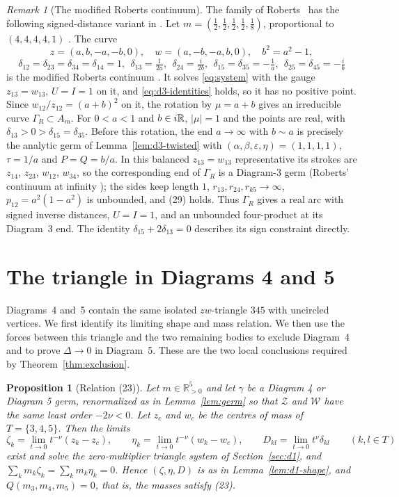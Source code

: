 \documentclass[Threeside,11pt]{article}
\newtheorem{proposition}[theorem]{Proposition}
\theoremstyle{definition}
\theoremstyle{remark}
\newtheorem{remark}[theorem]{Remark}
\numberwithin{equation}{section}
\theoremstyle{remark}
\newcommand{\Rp}{\mathbb{R}_{>0}}
\begin{document}
\begin{remark}[The modified Roberts continuum]\label{rem:d3-roberts}
The family of Roberts~\cite{Roberts} has the following signed-distance variant in \cite{AK}.
Let $m=(\frac12,\frac12,\frac12,\frac12,\frac18)$, proportional to $(4,4,4,4,1)$
\cite[Rem.~8, p.~583]{AK}.  The curve
\[
z=(a,b,-a,-b,0),\quad w=(a,-b,-a,b,0),\quad b^2=a^2-1,
\]
\[
\delta_{12}=\delta_{23}=\delta_{34}=\delta_{14}=1,\ \ \delta_{13}=\tfrac1{2a},\ \
\delta_{24}=\tfrac{i}{2b},\ \ \delta_{15}=\delta_{35}=-\tfrac1a,\ \ \delta_{25}=\delta_{45}=-\tfrac ib
\]
is the modified Roberts continuum \cite[p.~543]{AK}.  It solves \eqref{eq:system} with the gauge
$z_{13}=w_{13}$, $U=I=1$ on it, and \eqref{eq:d3-identities} holds, so it has no positive point.
Since $w_{12}/z_{12}=(a+b)^2$ on it, the rotation by $\mu=a+b$ gives an irreducible curve
$\Gamma_R\subset A_m$.  For $0<a<1$ and $b\in i\mathbb R$, $|\mu|=1$ and the points are real, with
$\delta_{13}>0>\delta_{15}=\delta_{35}$.
{Before this rotation, the end $a\to\infty$ with $b\sim a$ is precisely the analytic
germ of Lemma~\ref{lem:d3-twisted} with
$(\alpha,\beta,\varepsilon,\eta)=(1,1,1,1)$, $\tau=1/a$ and $P=Q=b/a$.
In this balanced $z_{13}=w_{13}$ representative its strokes are
$z_{14}$, $z_{23}$, $w_{12}$, $w_{34}$, so the corresponding end of $\Gamma_R$ is a Diagram-3 germ}
(Roberts' continuum at infinity \cite[\S7.2]{AK}); the sides keep length $1$,
$r_{13},r_{24},r_{k5}\to\infty$, $p_{12}=a^2(1-a^2)$ is unbounded, and (29) holds.
{Thus $\Gamma_R$ gives a real arc with signed inverse distances,
$U=I=1$, and an unbounded four-product at its Diagram~3 end. The identity
$\delta_{15}+2\delta_{13}=0$ describes its sign constraint directly.}
\end{remark}




\section{The triangle in Diagrams 4 and 5}\label{sec:d45}

{Diagrams~4 and~5 contain the same isolated $zw$-triangle $345$ with uncircled vertices.
We first identify its limiting shape and mass relation. We then use the forces between
this triangle and the two remaining bodies to exclude Diagram~4 and to prove
$\Delta\to0$ in Diagram~5. These are the two local conclusions required by
Theorem~\ref{thm:exclusion}.}

\begin{proposition}[Relation (23)]\label{prop:d45-first}
Let $m\in\Rp^5$ and let $\gamma$ be a Diagram 4 or Diagram 5 germ, renormalized as in
Lemma~\ref{lem:germ} so that $\mathcal Z$ and $\mathcal W$ have the same least order $-2\nu<0$.
Let $z_c$ and $w_c$ be the centres of mass of $T=\{3,4,5\}$.  Then the limits
\[
  \zeta_k=\lim_{t\to0}t^{-\nu}(z_k-z_c),\qquad \eta_k=\lim_{t\to0}t^{-\nu}(w_k-w_c),\qquad
  D_{kl}=\lim_{t\to0}t^{\nu}\delta_{kl}\qquad(k,l\in T)
\]
exist and solve the zero-multiplier triangle system of Section~\ref{sec:d1}, and
$\sum_km_k\zeta_k=\sum_km_k\eta_k=0$.  Hence $(\zeta,\eta,D)$ is as in
Lemma~\ref{lem:d1-shape}, and $Q(m_3,m_4,m_5)=0$, that is, the masses satisfy (23).
\end{proposition}
\end{document}

